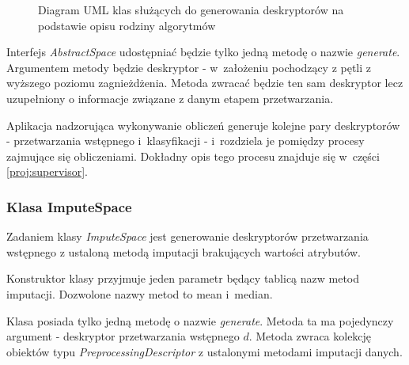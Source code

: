 \documentclass[../thesis.tex]{subfiles}
\begin{document}
\begin{figure}[h]
\centering
{}
\caption{Diagram UML klas służących do generowania deskryptorów na podstawie opisu rodziny algorytmów}
\label{proj:diagram_spaces}
\end{figure}

Interfejs \emph{AbstractSpace} udostępniać będzie tylko jedną metodę o nazwie \emph{generate}. Argumentem metody będzie deskryptor - w~założeniu pochodzący z pętli z wyższego poziomu zagnieżdżenia. Metoda zwracać będzie ten sam deskryptor lecz uzupełniony o informacje związane z danym etapem przetwarzania.

Aplikacja nadzorująca wykonywanie obliczeń generuje kolejne pary deskryptorów - przetwarzania wstępnego i~klasyfikacji - i~rozdziela je pomiędzy procesy zajmujące się obliczeniami. Dokładny opis tego procesu znajduje się w~części \ref{proj:supervisor}.

\subsubsection{Klasa ImputeSpace}

Zadaniem klasy \emph{ImputeSpace} jest generowanie deskryptorów przetwarzania wstępnego z ustaloną metodą imputacji brakujących wartości atrybutów. 

Konstruktor klasy przyjmuje jeden parametr będący tablicą nazw metod imputacji. Dozwolone nazwy metod to mean i~median. 

Klasa posiada tylko jedną metodę o nazwie \emph{generate}. Metoda ta ma pojedynczy argument - deskryptor przetwarzania wstępnego $d$. Metoda zwraca kolekcję obiektów typu \emph{PreprocessingDescriptor} z ustalonymi metodami imputacji danych.
\end{document}
